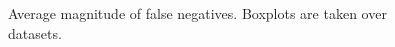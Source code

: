 \documentclass[11pt]{article}
\begin{document}
\begin{figure}[H]
	\centering
	\caption{Average magnitude of false negatives. Boxplots are taken over datasets.}
	\label{fig:exp3-sel-acc}
\end{figure}
\end{document}
